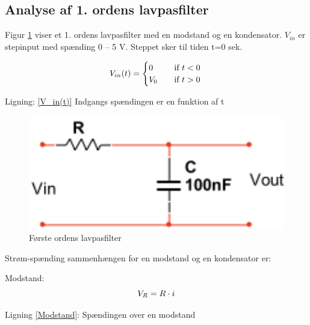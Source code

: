 \subsection{Analyse af 1. ordens lavpasfilter}
Figur \ref{lavpasfilter} viser et 1. ordens lavpasfilter med en modstand og en kondensator. $V_{in}$ er stepinput med spænding 0 – 5 V. Steppet sker til tiden t=0 sek.


\begin{equation}
 V_{in}(t) =
  \begin{cases}
    0 & \quad \text{if } t <0\\
    V_{0}&\quad \text{if } t >0\\
  \end{cases}
\label{V_in(t)}\\
\end{equation}
\begin{center}
Ligning: \ref{V_in(t)} Indgangs spændingen er en funktion af t
\end{center}


\begin{figure}[h]
\begin{center}
\includegraphics[height=5cm]{M_Fig/Ana_1_Ordens_Lavpasfilter}
\caption{Første ordens lavpasfilter}
\label{lavpasfilter}
\end{center}
\end{figure}





Strøm-spænding sammenhængen for en modstand og en kondensator er:


Modstand:
\begin{equation}
 V_{R} =R\cdot i
\label{Modstand}\\
\end{equation}
\begin{center}
Ligning \ref{Modstand}: Spændingen over en modstand
\end{center}

